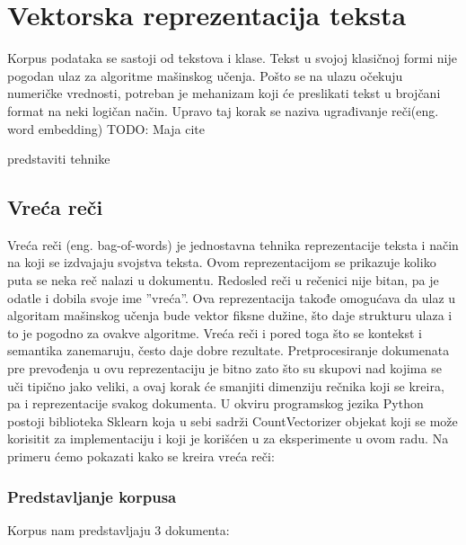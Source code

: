 \documentclass[12pt,oneside]{memoir}
\begin{document}
\section{Vektorska reprezentacija teksta}

Korpus podataka se sastoji od tekstova i klase.  Tekst u svojoj klasičnoj formi nije pogodan ulaz za algoritme mašinskog učenja.  Pošto se na ulazu očekuju numeričke vrednosti,  potreban je mehanizam koji će preslikati tekst u brojčani format na neki logičan način.  Upravo taj korak se naziva ugrađivanje reči(eng.  word embedding) TODO:  Maja cite 

predstaviti tehnike

\subsection{Vreća reči}
Vreća reči (eng. bag-of-words) je jednostavna tehnika reprezentacije teksta i način na koji se izdvajaju svojstva teksta.  Ovom reprezentacijom se prikazuje koliko puta se neka reč nalazi u dokumentu.  Redosled reči u rečenici nije bitan,  pa je odatle i dobila svoje ime ”vreća”.  Ova reprezentacija takođe omogućava da ulaz u algoritam mašinskog učenja bude vektor fiksne dužine,  što daje strukturu ulaza i to je pogodno za ovakve algoritme.  Vreća reči i pored toga što se kontekst i semantika zanemaruju,  često daje dobre rezultate.  
Pretprocesiranje dokumenata pre prevođenja u ovu reprezentaciju je bitno zato što su skupovi nad kojima se uči tipično jako veliki, a ovaj korak će smanjiti dimenziju rečnika koji se kreira, pa i reprezentacije svakog dokumenta.  
U okviru programskog jezika Python postoji biblioteka Sklearn koja u sebi sadrži CountVectorizer objekat koji se može korisitit za implementaciju i koji je korišćen u za eksperimente u ovom radu. 
Na primeru ćemo pokazati kako se kreira vreća reči:

\subsubsection{Predstavljanje korpusa}
Korpus nam predstavljaju 3 dokumenta:
\newline
\newline
\noindent{}
\newline
\newline
\end{document}
